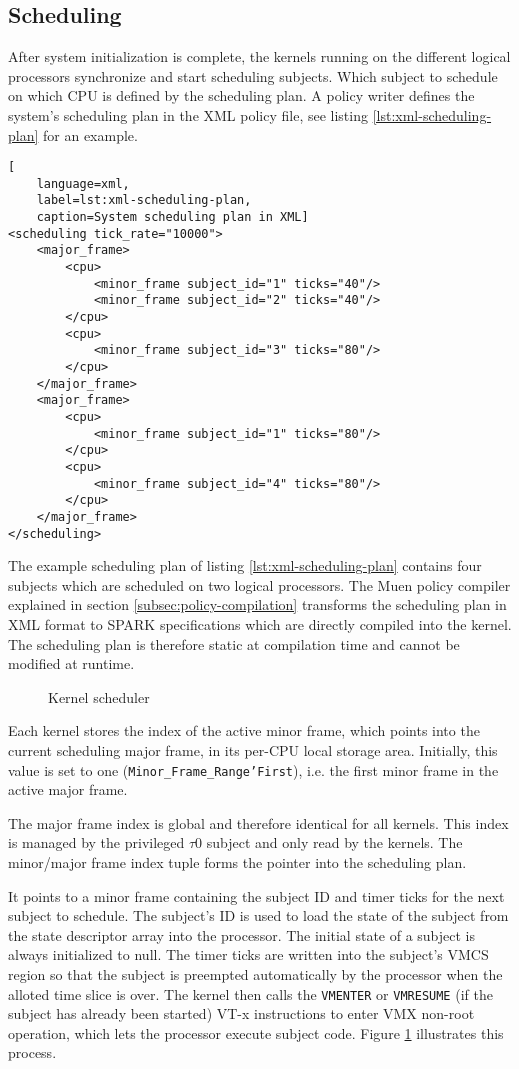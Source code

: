 \subsection{Scheduling}\label{subsec:scheduling}
After system initialization is complete, the kernels running on the different
logical processors synchronize and start scheduling subjects. Which subject to
schedule on which CPU is defined by the scheduling plan. A policy writer defines
the system's scheduling plan in the XML policy file, see listing
\ref{lst:xml-scheduling-plan} for an example.

\begin{lstlisting}[
	language=xml,
	label=lst:xml-scheduling-plan,
	caption=System scheduling plan in XML]
<scheduling tick_rate="10000">
	<major_frame>
		<cpu>
			<minor_frame subject_id="1" ticks="40"/>
			<minor_frame subject_id="2" ticks="40"/>
		</cpu>
		<cpu>
			<minor_frame subject_id="3" ticks="80"/>
		</cpu>
	</major_frame>
	<major_frame>
		<cpu>
			<minor_frame subject_id="1" ticks="80"/>
		</cpu>
		<cpu>
			<minor_frame subject_id="4" ticks="80"/>
		</cpu>
	</major_frame>
</scheduling>
\end{lstlisting}

The example scheduling plan of listing \ref{lst:xml-scheduling-plan} contains
four subjects which are scheduled on two logical processors. The Muen policy
compiler explained in section \ref{subsec:policy-compilation} transforms the
scheduling plan in XML format to SPARK specifications which are directly
compiled into the kernel. The scheduling plan is therefore static at compilation
time and cannot be modified at runtime.

\begin{figure}[h]
	\centering
	
	\caption{Kernel scheduler}
	\label{fig:kernel-scheduler}
\end{figure}

Each kernel stores the index of the active minor frame, which points into the
current scheduling major frame, in its per-CPU local storage area. Initially,
this value is set to one (\texttt{Minor\_Frame\_Range'First}), i.e. the first
minor frame in the active major frame.

The major frame index is global and therefore identical for all kernels. This
index is managed by the privileged $\tau$0 subject and only read by the kernels.
The minor/major frame index tuple forms the pointer into the scheduling plan.

It points to a minor frame containing the subject ID and timer ticks for the
next subject to schedule. The subject's ID is used to load the state of the
subject from the state descriptor array into the processor. The initial state of
a subject is always initialized to null. The timer ticks are written into the
subject's VMCS region so that the subject is preempted automatically by the
processor when the alloted time slice is over. The kernel then calls the
\texttt{VMENTER} or \texttt{VMRESUME} (if the subject has already been started)
VT-x instructions to enter VMX non-root operation, which lets the processor
execute subject code. Figure \ref{fig:kernel-scheduler} illustrates this
process.


